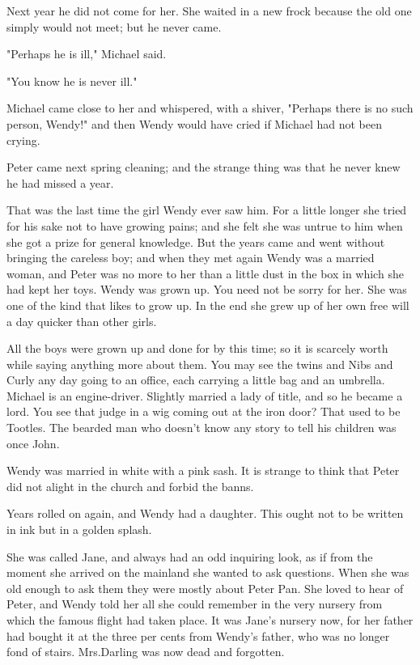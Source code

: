Next year he did not come for her.
She waited in a new frock because the old one simply would not meet;
but he never came.

"Perhaps he is ill," Michael said.

"You know he is never ill."

Michael came close to her and whispered, with a shiver,
"Perhaps there is no such person, Wendy!\@"
and then Wendy would have cried if Michael had not been crying.

Peter came next spring cleaning;
and the strange thing was that he never knew he had missed a year.

That was the last time the girl Wendy ever saw him.
For a little longer she tried for his sake not to have growing pains;
and she felt she was untrue to him when she got a prize for general knowledge.
But the years came and went without bringing the careless boy;
and when they met again Wendy was a married woman,
and Peter was no more to her than a little dust in the box in which she had kept her toys.
Wendy was grown up.
You need not be sorry for her.
She was one of the kind that likes to grow up.
In the end she grew up of her own free will a day quicker than other girls.

All the boys were grown up and done for by this time;
so it is scarcely worth while saying anything more about them.
You may see the twins and Nibs and Curly any day going to an office,
each carrying a little bag and an umbrella.
Michael is an engine-driver.
Slightly married a lady of title, and so he became a lord.
You see that judge in a wig coming out at the iron door?
That used to be Tootles.
The bearded man who doesn't know any story to tell his children was once John.

Wendy was married in white with a pink sash.
It is strange to think that Peter did not alight in the church and forbid the banns.

Years rolled on again, and Wendy had a daughter.
This ought not to be written in ink but in a golden splash.

She was called Jane, and always had an odd inquiring look,
as if from the moment she arrived on the mainland she wanted to ask questions.
When she was old enough to ask them they were mostly about Peter Pan.
She loved to hear of Peter,
and Wendy told her all she could remember in the very nursery from which the famous flight had taken place.
It was Jane's nursery now,
for her father had bought it at the three per cents from Wendy's father,
who was no longer fond of stairs.
Mrs.\@ Darling was now dead and forgotten.

